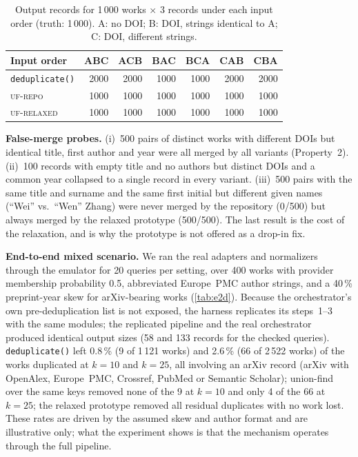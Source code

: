 \documentclass[conference]{IEEEtran}
\newcommand{\code}[1]{\texttt{\small #1}}
\begin{document}
\begin{table}[t]
\centering
\caption{Output records for 1\,000 works $\times$ 3 records under each input order (truth: 1\,000). A: no DOI; B: DOI, strings identical to A; C: DOI, different strings.}
\label{tab:order}
\footnotesize
\begin{tabular}{@{}l r r r r r r@{}}
\toprule
Input order & ABC & ACB & BAC & BCA & CAB & CBA \\
\midrule
\code{deduplicate()} & 2000 & 2000 & 1000 & 1000 & 2000 & 2000 \\
\textsc{uf-repo} & 1000 & 1000 & 1000 & 1000 & 1000 & 1000 \\
\textsc{uf-relaxed} & 1000 & 1000 & 1000 & 1000 & 1000 & 1000 \\
\bottomrule
\end{tabular}
\end{table}

\textbf{False-merge probes.} (i)~500 pairs of distinct works with different DOIs but identical title, first author and year were all merged by all variants (Property~2). (ii)~100 records with empty title and no authors but distinct DOIs and a common year collapsed to a single record in every variant. (iii)~500 pairs with the same title and surname and the same first initial but different given names (``Wei'' vs.\ ``Wen'' Zhang) were never merged by the repository (0/500) but always merged by the relaxed prototype (500/500). The last result is the cost of the relaxation, and is why the prototype is not offered as a drop-in fix.

\textbf{End-to-end mixed scenario.} We ran the real adapters and normalizers through the emulator for 20 queries per setting, over 400 works with provider membership probability 0.5, abbreviated Europe~PMC author strings, and a 40\,\% preprint-year skew for arXiv-bearing works (\cref{tab:e2d}). Because the orchestrator's own pre-deduplication list is not exposed, the harness replicates its steps~1--3 with the same modules; the replicated pipeline and the real orchestrator produced identical output sizes (58 and 133 records for the checked queries). \code{deduplicate()} left 0.8\,\% (9 of 1\,121 works) and 2.6\,\% (66 of 2\,522 works) of the works duplicated at $k{=}10$ and $k{=}25$, all involving an arXiv record (arXiv with OpenAlex, Europe~PMC, Crossref, PubMed or Semantic Scholar); union-find over the same keys removed none of the 9 at $k{=}10$ and only 4 of the 66 at $k{=}25$; the relaxed prototype removed all residual duplicates with no work lost. These rates are driven by the assumed skew and author format and are illustrative only; what the experiment shows is that the mechanism operates through the full pipeline.
\end{document}
